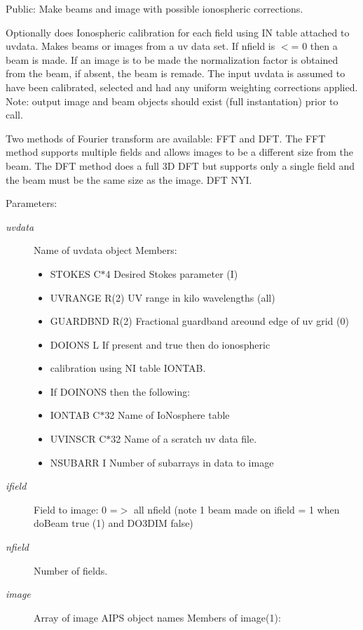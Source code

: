 Public: Make beams and image with possible ionospheric corrections. 

Optionally does Ionospheric calibration for each field using IN table attached to uvdata. Makes beams or images from a uv data set. If nfield is $<$= 0 then a beam is made. If an image is to be made the normalization factor is obtained from the beam, if absent, the beam is remade. The input uvdata is assumed to have been calibrated, selected and had any uniform weighting corrections applied. Note: output image and beam objects should exist (full instantation) prior to call.

Two methods of Fourier transform are available: FFT and DFT. The FFT method supports multiple fields and allows images to be a different size from the beam. The DFT method does a full 3D DFT but supports only a single field and the beam must be the same size as the image. DFT NYI. \begin{Desc}
\item[Parameters:]
\begin{description}
\item[{\em uvdata}]Name of uvdata object Members: \begin{itemize}
\item STOKES C$\ast$4 Desired Stokes parameter (I) \item UVRANGE R(2) UV range in kilo wavelengths (all) \item GUARDBND R(2) Fractional guardband areound edge of uv grid (0) \item DOIONS L If present and true then do ionospheric \item calibration using NI table IONTAB. \item If DOINONS then the following: \item IONTAB C$\ast$32 Name of Io\-Nosphere table \item UVINSCR C$\ast$32 Name of a scratch uv data file. \item NSUBARR I Number of subarrays in data to image \end{itemize}
\item[{\em ifield}]Field to image: 0 =$>$ all nfield (note 1 beam made on ifield = 1 when do\-Beam true (1) and DO3DIM false) \item[{\em nfield}]Number of fields. \item[{\em image}]Array of image AIPS object names Members of image(1): \begin{itemize}

\end{itemize}
\end{description}
\end{Desc}
